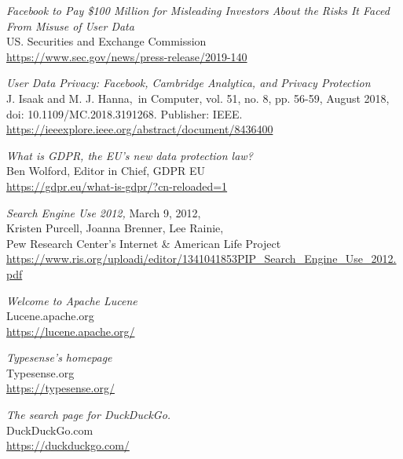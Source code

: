 \begin{thebibliography}{1}
\emph{
    Facebook to Pay \$100 Million for Misleading Investors About the Risks It
    Faced From Misuse of User Data
}
\\
\color{gray}
    US. Securities and Exchange Commission
\\
\color{black}
\scriptsize{
\url{
https://www.sec.gov/news/press-release/2019-140
            }
}
\normalsize

\emph{
    User Data Privacy: Facebook, Cambridge Analytica, and Privacy Protection
}
\\
\color{gray}
J. Isaak and M. J. Hanna,\color{black}\ in Computer, vol. 51, no. 8, pp. 56-59,
August 2018, doi: 10.1109/MC.2018.3191268. Publisher: IEEE.
\\
\color{black}
\scriptsize{
    \url{
https://ieeexplore.ieee.org/abstract/document/8436400
            }
}
\normalsize

\emph{
    What is GDPR, the EU’s new data protection law?
    }
    \\
    \color{gray}
    Ben Wolford, Editor in Chief, GDPR EU
    \\
    \color{black}
    \scriptsize{
        \url{
            https://gdpr.eu/what-is-gdpr/?cn-reloaded=1
        }
    }
    \normalsize

    \emph{
        Search Engine Use 2012,
    } March 9, 2012,
    \\
    \color{gray}
        Kristen Purcell,
        Joanna Brenner,
        Lee Rainie,
    \\
    \color{black}
        Pew Research Center’s Internet \& American Life Project
    \\
    \scriptsize
        \url{
            https://www.ris.org/uploadi/editor/1341041853PIP_Search_Engine_Use_2012.pdf
        }
    \normalsize

\emph{
Welcome to Apache Lucene
}
\\
\color{gray}
Lucene.apache.org
\\
\color{black}
\scriptsize
\url{
https://lucene.apache.org/
        }
\normalsize

\emph{
Typesense's homepage
}
\\
\color{gray}
Typesense.org
\\
\color{black}
\scriptsize
\url{
https://typesense.org/
        }
\normalsize

\emph{
    The search page for DuckDuckGo.
}
\\
\color{gray}
    DuckDuckGo.com
    \\
    \color{black}
    \scriptsize
        \url{
            https://duckduckgo.com/
        }
    \normalsize


\end{thebibliography}

